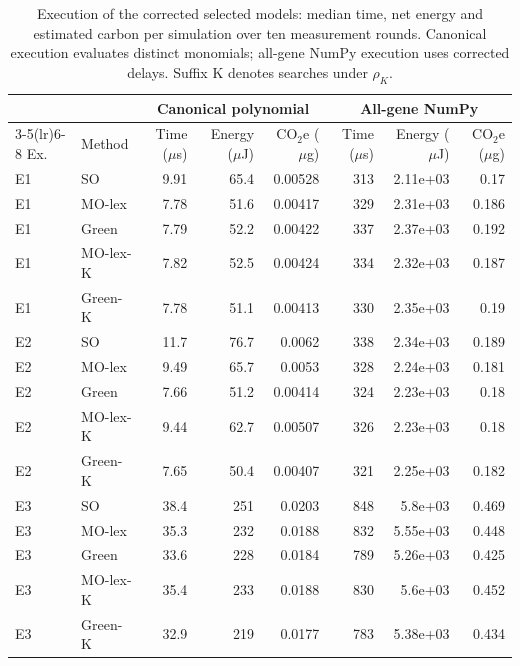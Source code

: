 \begin{table}[!htbp]
\centering
\caption{Execution of the corrected selected models: median time, net energy and estimated carbon per simulation over ten measurement rounds. Canonical execution evaluates distinct monomials; all-gene NumPy execution uses corrected delays. Suffix K denotes searches under $\rho_K$.}
\label{tab:corrected_energy}
\setlength{\tabcolsep}{3pt}
\begin{tabular}{llrrrrrr}
\toprule
 & & \multicolumn{3}{c}{Canonical polynomial} & \multicolumn{3}{c}{All-gene NumPy} \\
\cmidrule(lr){3-5}\cmidrule(lr){6-8}
Ex. & Method & Time ($\mu$s) & Energy ($\mu$J) & CO$_2$e ($\mu$g) & Time ($\mu$s) & Energy ($\mu$J) & CO$_2$e ($\mu$g) \\
\midrule
E1 & SO & 9.91 & 65.4 & 0.00528 & 313 & 2.11e+03 & 0.17 \\
E1 & MO-lex & 7.78 & 51.6 & 0.00417 & 329 & 2.31e+03 & 0.186 \\
E1 & Green & 7.79 & 52.2 & 0.00422 & 337 & 2.37e+03 & 0.192 \\
E1 & MO-lex-K & 7.82 & 52.5 & 0.00424 & 334 & 2.32e+03 & 0.187 \\
E1 & Green-K & 7.78 & 51.1 & 0.00413 & 330 & 2.35e+03 & 0.19 \\
\midrule
E2 & SO & 11.7 & 76.7 & 0.0062 & 338 & 2.34e+03 & 0.189 \\
E2 & MO-lex & 9.49 & 65.7 & 0.0053 & 328 & 2.24e+03 & 0.181 \\
E2 & Green & 7.66 & 51.2 & 0.00414 & 324 & 2.23e+03 & 0.18 \\
E2 & MO-lex-K & 9.44 & 62.7 & 0.00507 & 326 & 2.23e+03 & 0.18 \\
E2 & Green-K & 7.65 & 50.4 & 0.00407 & 321 & 2.25e+03 & 0.182 \\
\midrule
E3 & SO & 38.4 & 251 & 0.0203 & 848 & 5.8e+03 & 0.469 \\
E3 & MO-lex & 35.3 & 232 & 0.0188 & 832 & 5.55e+03 & 0.448 \\
E3 & Green & 33.6 & 228 & 0.0184 & 789 & 5.26e+03 & 0.425 \\
E3 & MO-lex-K & 35.4 & 233 & 0.0188 & 830 & 5.6e+03 & 0.452 \\
E3 & Green-K & 32.9 & 219 & 0.0177 & 783 & 5.38e+03 & 0.434 \\
\bottomrule
\end{tabular}
\end{table}
